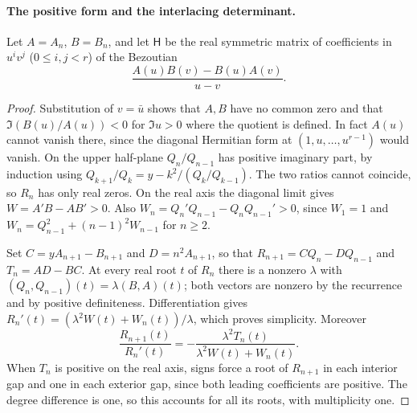 \paragraph{The positive form and the interlacing determinant.}
Let $A=A_n$, $B=B_n$, and let $\mathsf H$ be the real symmetric matrix of
coefficients in $u^iv^j$ ($0\le i,j<r$) of the Bezoutian
\[
 \frac{A(u)B(v)-B(u)A(v)}{u-v}.
\]


\begin{proof}
Substitution of $v=\bar u$ shows that $A,B$ have no common zero and that
$\Im(B(u)/A(u))<0$ for $\Im u>0$ where the quotient is defined. In fact
$A(u)$ cannot vanish there, since the diagonal Hermitian form at
$(1,u,\dots,u^{r-1})$ would vanish. On the upper half-plane
$Q_n/Q_{n-1}$ has positive imaginary part, by induction using
$Q_{k+1}/Q_k=y-k^2/(Q_k/Q_{k-1})$. The two ratios cannot coincide, so
$R_n$ has only real zeros. On the real axis the diagonal limit gives
$W=A'B-AB'>0$. Also $W_n=Q_n'Q_{n-1}-Q_nQ_{n-1}'>0$, since $W_1=1$ and
$W_n=Q_{n-1}^2+(n-1)^2W_{n-1}$ for $n\ge2$.

Set $C=yA_{n+1}-B_{n+1}$ and $D=n^2A_{n+1}$, so that
$R_{n+1}=CQ_n-DQ_{n-1}$ and $T_n=AD-BC$. At every real root $t$ of $R_n$
there is a nonzero $\lambda$ with
$(Q_n,Q_{n-1})(t)=\lambda(B,A)(t)$; both vectors are nonzero by the
recurrence and by positive definiteness. Differentiation gives
$R_n'(t)=(\lambda^2W(t)+W_n(t))/\lambda$, which proves simplicity.
Moreover
\[
 \frac{R_{n+1}(t)}{R_n'(t)}=-\frac{\lambda^2T_n(t)}{\lambda^2W(t)+W_n(t)} .
\]
When $T_n$ is positive on the real axis, signs force a root of $R_{n+1}$
in each interior gap and one in each exterior gap, since both leading
coefficients are positive. The degree difference is one, so this accounts
for all its roots, with multiplicity one.
\end{proof}

